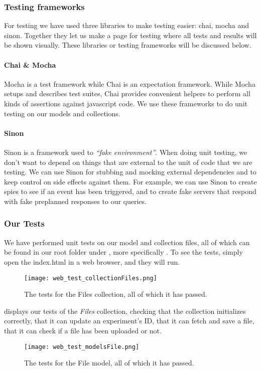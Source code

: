 \subsubsection{Testing frameworks}
For testing we have used three libraries to make testing easier: chai, mocha and sinon. Together they let us make a page for testing where all tests and results will be shown visually.
These libraries or testing frameworks will be discussed below.

\paragraph{Chai \& Mocha}
Mocha\cite{web_8} is a test framework while Chai\cite{web_7} is an expectation framework. While Mocha setups and describes test suites, Chai provides convenient helpers to perform all kinds of assertions against javascript code. We use these frameworks to do unit testing on our models and collections.

\paragraph{Sinon}
Sinon\cite{web_9} is a framework used to \textit{“fake environment”}. When doing unit testing, we don’t want to depend on things that are external to the unit of code that we are testing. We can use Sinon for stubbing and mocking external dependencies and to keep control on side effects against them. For example, we can use Sinon to create spies to see if an event has been triggered, and to create fake servers that respond with fake preplanned responses to our queries.

\subsubsection{Our Tests}
We have performed unit tests on our model and collection files, all of which can be found in our root folder under , more specifically . To see the tests, simply open the index.html in a web browser, and they will run.

\begin{figure}[h]
\centering
\texttt{[image: web\_test\_collectionFiles.png]}
\caption{The tests for the Files collection, all of which it has passed.}
\label{fig:web_test_collectionFiles}
\end{figure}

 displays our tests of the \textit{Files} collection, checking that the collection initializes correctly, that it can update an experiment’s ID, that it can fetch and save a file, that it can check if a file has been uploaded or not.
\begin{figure}[h]
\centering
\texttt{[image: web\_test\_modelsFile.png]}
\caption{The tests for the File model, all of which it has passed.}
\label{fig:web_test_modelsFile}
\end{figure}

